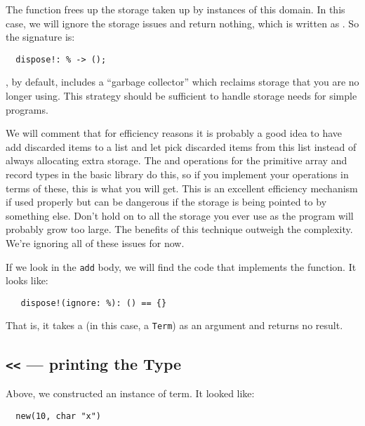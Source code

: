The function  frees up the storage taken up by instances
of this domain. In this case, we will ignore the storage issues
and return nothing, which is written as \ttin{()}. So the signature is:

\begin{small}
\begin{verbatim}
  dispose!: % -> ();
\end{verbatim}
\end{small}

\asharp{}, by default, includes a ``garbage collector'' which reclaims storage
that you are no longer using. This strategy should be sufficient to handle
storage needs for simple programs.

We will comment that for efficiency reasons it is probably a good idea
to have  add discarded items to a list and let
 pick discarded items from this list instead of always
allocating extra storage.  The  and 
operations for the primitive array and record types in the basic
\asharp{} library do this, so if you implement your operations in
terms of these, this is what you will get.  This is an excellent
efficiency mechanism if used properly but can be dangerous if the
storage is being pointed to by something else.  Don't hold on to all
the storage you ever use as the program will probably grow too large.
The benefits of this technique outweigh the complexity.  We're
ignoring all of these issues for now.

If we look in the \verb"add" body,
we will find the code that implements the
 function. It looks like:

\begin{small}
\begin{verbatim}
   dispose!(ignore: %): () == {}
\end{verbatim}
\end{small}

That is, it takes a \ttin{\%} (in this case, a \verb"Term") as an argument and returns
no result.

\subsection{{\tt <<} --- printing the Type}

Above, we constructed an instance of term. It looked like:
 
\begin{small}
\begin{verbatim}
  new(10, char "x") 
\end{verbatim}
\end{small}

